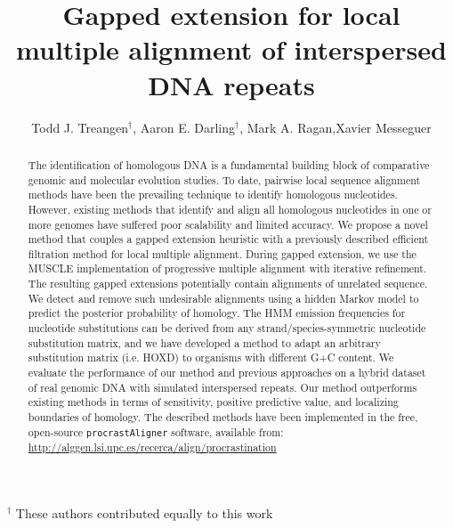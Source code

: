 \documentclass{llncs}
\begin{document}

\title{Gapped extension for local multiple alignment of interspersed DNA repeats}

\author{Todd J. Treangen$^\dag$, Aaron E. Darling$^\dag$, Mark A. Ragan,Xavier Messeguer}
%
%

\maketitle
{\center \scriptsize $^\dag$ These authors contributed equally to this work \\}

\begin{abstract}
The identification of homologous DNA is a fundamental building block
of comparative genomic and molecular evolution studies. To date,
pairwise local sequence alignment methods have been the prevailing
technique to identify homologous nucleotides. However, existing
methods that identify and align all homologous nucleotides in one or
more genomes have suffered poor scalability and limited accuracy. We
propose a novel method that couples a gapped extension heuristic with
a previously described efficient filtration method for local multiple
alignment.  During gapped extension, we use the MUSCLE implementation
of progressive multiple alignment with iterative refinement.  The
resulting gapped extensions potentially contain alignments of
unrelated sequence.  We detect and
remove such undesirable alignments using a hidden Markov model to
predict the posterior probability of homology. The HMM
emission frequencies for nucleotide substitutions can be derived from
any strand/species-symmetric nucleotide substitution matrix, and we
have developed a method to adapt an arbitrary substitution matrix
(i.e. HOXD) to organisms with different G+C content. We evaluate the
performance of our method and previous approaches on a hybrid dataset
of real genomic DNA with simulated interspersed repeats.  Our method
outperforms existing methods in terms of sensitivity,
positive predictive value, and localizing boundaries of homology.  The
described methods have been implemented in the free, open-source
\texttt{procrastAligner} software, available from: \\
\url{http://alggen.lsi.upc.es/recerca/align/procrastination}
\end{abstract}
\end{document}
